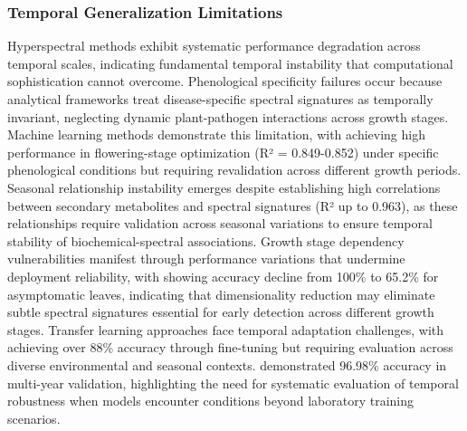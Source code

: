 \documentclass[sn-mathphys]{sn-jnl}
\theoremstyle{thmstyleone}%
\theoremstyle{thmstyletwo}%
\theoremstyle{thmstylethree}%
\begin{document}
\subsubsection{Temporal Generalization Limitations}
Hyperspectral methods exhibit systematic performance degradation across temporal scales, indicating fundamental temporal instability that computational sophistication cannot overcome. Phenological specificity failures occur because analytical frameworks treat disease-specific spectral signatures as temporally invariant, neglecting dynamic plant-pathogen interactions across growth stages. Machine learning methods demonstrate this limitation, with \citet{feng2022hyperspectral} achieving high performance in flowering-stage optimization (R² = 0.849-0.852) under specific phenological conditions but requiring revalidation across different growth periods. Seasonal relationship instability emerges despite \citet{ban2025evaluation} establishing high correlations between secondary metabolites and spectral signatures (R² up to 0.963), as these relationships require validation across seasonal variations to ensure temporal stability of biochemical-spectral associations. Growth stage dependency vulnerabilities manifest through performance variations that undermine deployment reliability, with \citet{lu2018detection} showing accuracy decline from 100\% to 65.2\% for asymptomatic leaves, indicating that dimensionality reduction may eliminate subtle spectral signatures essential for early detection across different growth stages. Transfer learning approaches face temporal adaptation challenges, with \citet{feng2021hyperspectral} achieving over 88\% accuracy through fine-tuning but requiring evaluation across diverse environmental and seasonal contexts. \citet{liu2025early} demonstrated 96.98\% accuracy in multi-year validation, highlighting the need for systematic evaluation of temporal robustness when models encounter conditions beyond laboratory training scenarios.
\end{document}
